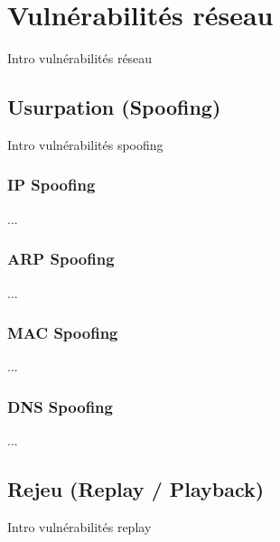 

\chapter{Vulnérabilités réseau}\label{vulnerabilites:reseau}

Intro vulnérabilités réseau

\section{Usurpation (Spoofing)}\label{vulnerabilites:reseau:spoofing}

Intro vulnérabilités spoofing

\subsection{IP Spoofing}\label{vulnerabilites:reseau:spoofing:ip}

...

\subsection{ARP Spoofing}\label{vulnerabilites:reseau:spoofing:arp}

...

\subsection{MAC Spoofing}\label{vulnerabilites:reseau:spoofing:mac}

...

\subsection{DNS Spoofing}\label{vulnerabilites:reseau:spoofing:dns}

...

\section{Rejeu (Replay / Playback)}\label{vulnerabilites:reseau:replay}

Intro vulnérabilités replay

